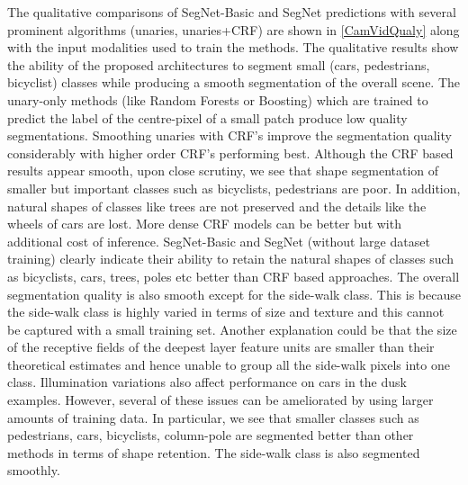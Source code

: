 The qualitative comparisons of SegNet-Basic and SegNet predictions with several prominent algorithms (unaries, unaries+CRF) are shown in \cref{CamVidQualy} along with the input modalities used to train the methods. The qualitative results show the ability of the proposed architectures to segment small (cars, pedestrians, bicyclist) classes while producing a smooth segmentation of the overall scene. The unary-only methods (like Random Forests or Boosting) which are trained to predict the label of the centre-pixel of a small patch produce low quality segmentations. Smoothing unaries with CRF's improve the segmentation quality considerably with higher order CRF's performing best. Although the CRF based results appear smooth, upon close scrutiny, we see that shape segmentation of smaller but important classes such as bicyclists, pedestrians are poor. In addition, natural shapes of classes like trees are not preserved and the details like the wheels of cars are lost.  More dense CRF models \citep{koltun2011efficient} can be better but with additional cost of inference. SegNet-Basic and SegNet (without large dataset training) clearly indicate their ability to retain the natural shapes of classes such as bicyclists, cars, trees, poles etc better than CRF based approaches. The overall segmentation quality is also smooth except for the side-walk class. This is because the side-walk class is highly varied in terms of size and texture and this cannot be captured with a small training set. Another explanation could be that the size of the receptive fields of the deepest layer feature units are smaller than their theoretical estimates \citep{zhou2014object,ParseNetRabinovich} and hence unable to group all the side-walk  pixels into one class. Illumination variations also affect performance on cars in the dusk examples. However, several of these issues can be ameliorated by using larger amounts of training data. In particular, we see that smaller classes such as pedestrians, cars, bicyclists, column-pole are segmented better than other methods in terms of shape retention. The side-walk class is also segmented smoothly.


